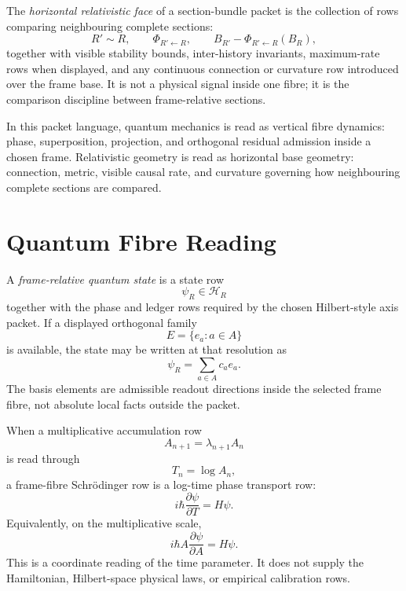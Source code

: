 \begin{definition}
\label{def:quantum-gr-horizontal-relativistic-face}
The \emph{horizontal relativistic face} of a section-bundle packet is the
collection of rows comparing neighbouring complete sections:
$$
R'\sim R,
\qquad
\Phi_{R'\leftarrow R},
\qquad
B_{R'}-\Phi_{R'\leftarrow R}(B_R),
$$
together with visible stability bounds, inter-history invariants,
maximum-rate rows when displayed, and any continuous connection or
curvature row introduced over the frame base. It is not a physical signal
inside one fibre; it is the comparison discipline between frame-relative
sections.
\end{definition}

\begin{principle}
\label{prin:quantum-gr-vertical-horizontal-reading}
In this packet language, quantum mechanics is read as vertical fibre
dynamics: phase, superposition, projection, and orthogonal residual
admission inside a chosen frame. Relativistic geometry is read as
horizontal base geometry: connection, metric, visible causal rate, and
curvature governing how neighbouring complete sections are compared.
\end{principle}


\section{Quantum Fibre Reading}
\label{sec:quantum-gr-quantum-fibre-reading}

\begin{definition}
\label{def:quantum-gr-frame-relative-quantum-state}
A \emph{frame-relative quantum state} is a state row
$$
\psi_R\in\mathcal H_R
$$
together with the phase and ledger rows required by the chosen
Hilbert-style axis packet. If a displayed orthogonal family
$$
E=\{e_a:a\in A\}
$$
is available, the state may be written at that resolution as
$$
\psi_R=\sum_{a\in A}c_a e_a.
$$
The basis elements are admissible readout directions inside the selected
frame fibre, not absolute local facts outside the packet.
\end{definition}

\begin{principle}
\label{prin:quantum-gr-unitary-log-time-transport}
When a multiplicative accumulation row
$$
A_{n+1}=\lambda_{n+1}A_n
$$
is read through
$$
T_n=\log A_n,
$$
a frame-fibre Schrödinger row is a log-time phase transport row:
$$
i\hbar\frac{\partial\psi}{\partial T}=H\psi.
$$
Equivalently, on the multiplicative scale,
$$
i\hbar A\frac{\partial\psi}{\partial A}=H\psi.
$$
This is a coordinate reading of the time parameter. It does not supply
the Hamiltonian, Hilbert-space physical laws, or empirical calibration
rows.
\end{principle}

